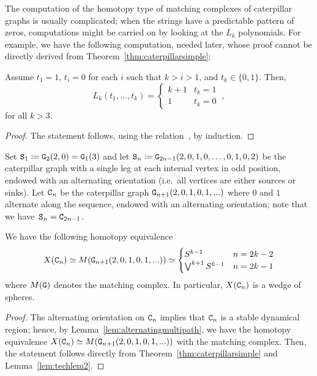 \documentclass{amsart}
\begin{document}
The computation of the homotopy type of matching complexes of caterpillar graphs is usually complicated; when the strings have a predictable pattern of zeros, computations might be carried on by looking at the $L_k$ polynomials. For example, we have the following computation, needed later, whose proof cannot be directly derived from Theorem~\ref{thm:caterpillarsimple};

\begin{lem}\label{lem:techlem2}
Assume $t_1 = 1 $, $t_{i} = 0$ for each $i$ such that $k >i > 1$, and $t_{k} \in \{ 0 ,1 \}$.
Then, \[ L_{k}(t_1, ... , t_{k}) = \begin{cases}
k + 1 & t_k = 1 \\ 1 & t_k = 0
\end{cases}\ ,\]
for all $k>3$.
\end{lem}
\begin{proof}
The statement follows, using the relation~\cite[Equation~(1)]{caterpillar}, by induction. 
\end{proof}



Set ${\tt S}_1\coloneqq {\tt G}_2(2,0)= {\tt G}_{1}(3)$ and let ${\tt S}_{n}\coloneqq {\tt G}_{2n-1}(2,0,1,0,\dots,0,1,0,2)$ be the caterpillar graph with a single leg at each internal vertex in odd position, endowed with an alternating orientation (i.e.~all vertices are either sources or sinks).
Let ${\tt C}_n$ be the caterpillar graph ${\tt G}_{n+1}(2,0,1,0,1,...)$ where $0$ and $1$ alternate along the sequence, endowed with an alternating orientation; note that we have~${\tt S}_n = {\tt C}_{2n-1}$.

\begin{lem}\label{lem:caterpillar20101}
 We have the following homotopy equivalence
\[ X({\tt C}_{n}) \simeq M({\tt G}_{n+1}(2,0,1,0,1,...)) \simeq \begin{cases}
S^{k-1} & n = 2k-2\\
\bigvee^{k+1} S^{k-1} & n = 2k-1
\end{cases}\]
where $M({\tt G})$ denotes the matching complex.
In particular, $X({\tt C}_{n})$ is a wedge of spheres.
\end{lem}

\begin{proof}
The alternating orientation on ${\tt C}_n$ implies that ${\tt C}_n$ is a stable dynamical region; hence, by Lemma~\ref{lem:alternatingmultipath}, we have the homotopy equivalence $X({\tt C}_{n}) \simeq M({\tt G}_{n+1}(2,0,1,0,1,...))$ with the matching complex. 
Then, the statement follows directly from Theorem~\ref{thm:caterpillarsimple} and Lemma~\ref{lem:techlem2}.
\end{proof}
\end{document}
